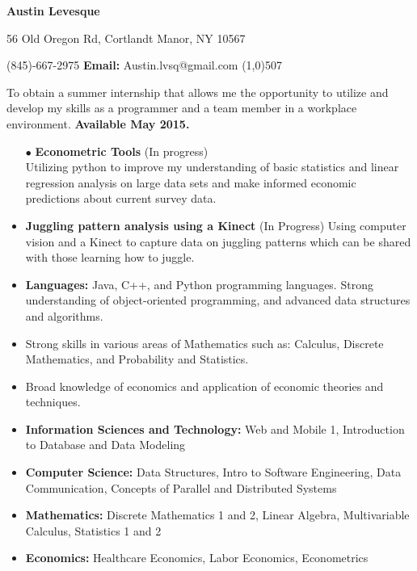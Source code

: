 \documentclass[11pt]{article}
\begin{document}
\centerline{\Large \bf Austin Levesque}
\vspace{.5ex}
\centerline{56 Old Oregon Rd, Cortlandt Manor, NY 10567}
\vspace{1ex}
 (845)-667-2975 \hfill {\bf Email:} Austin.lvsq@gmail.com
\line(1,0){507}
\vspace{2ex}

To obtain a summer internship that allows me the opportunity to utilize and develop my skills as a programmer and a team member in a workplace environment. {\bf Available May 2015.}
\vspace{1ex}

\begin{itemize}[topsep=.3ex, itemsep=0ex, partopsep=0ex, parsep=1ex]
	\item[$\bullet$] {\bf Econometric Tools} (In progress)\\
	Utilizing python to improve my understanding of basic statistics and linear regression analysis on large data sets and make informed economic predictions about current survey data.
	\item {\bf Juggling pattern analysis using a Kinect} (In Progress)
	Using computer vision and a Kinect to capture data on juggling patterns which can be shared with those learning how to juggle.
\end{itemize}
\vspace{1ex}
\begin{itemize} [topsep=.3ex, itemsep=0ex, partopsep=0ex, parsep=1ex]
	\item {\bf Languages:} Java, C++, and Python programming languages. Strong understanding of object-oriented programming, and advanced data structures and algorithms.
 	\item Strong skills in various areas of Mathematics such as: Calculus, Discrete Mathematics, and Probability and Statistics.
	\item Broad knowledge of economics and application of economic theories and techniques.
\end{itemize}
\vspace{1ex}
\begin{itemize}[topsep=0.3ex, itemsep=0ex, partopsep=0ex, parsep=0ex]
	\item {\bf Information Sciences and Technology:} Web and Mobile 1, Introduction to Database and Data Modeling
	\item {\bf Computer Science:} Data Structures, Intro to Software Engineering, Data Communication, Concepts of Parallel and Distributed Systems
	\item {\bf Mathematics:} Discrete Mathematics 1 and 2, Linear Algebra, Multivariable Calculus, Statistics 1 and 2
	\item {\bf Economics:} Healthcare Economics, Labor Economics, Econometrics
\end{itemize}
\end{document}
